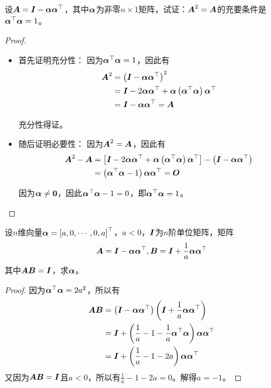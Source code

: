 \begin{problem}\label{problem-1.19}
设\(\mata=\mati-\vecal\vecal^\top\)，其中\(\vecal\)为非零\(n\times1\)矩阵，试证：\(\mata^2=\mata\)的充要条件是\(\vecal^\top\vecal=1\)。
\end{problem}
\begin{proof}
    \begin{itemize}
        \item 首先证明充分性：
              因为\(\vecal^\top\vecal=1\)，因此有
              \begin{align*}
                  \mata^2 & =\mypar{\mati-\vecal\vecal^\top}^2                                   \\
                          & =\mati-2\vecal\vecal^\top+\vecal\mypar{\vecal^\top\vecal}\vecal^\top \\
                          & =\mati-\vecal\vecal^\top=\mata
              \end{align*}

              充分性得证。

        \item 随后证明必要性：
              因为\(\mata^2=\mata\)，因此有
              \begin{align*}
                  \mata^2-\mata & =\mat{\mati-2\vecal\vecal^\top+\vecal\mypar{\vecal^\top\vecal}\vecal^\top}-\mypar{\mati-\vecal\vecal^\top} \\
                                & =\mypar{\vecal^\top\vecal-1}\vecal\vecal^\top=\mato
              \end{align*}

              因为\(\vecal\neq\veczero\)，因此\(\vecal^\top\vecal-1=0\)，即\(\vecal^\top\vecal=1\)。
    \end{itemize}
\end{proof}

\begin{problem}\label{problem-1.20}
设\(n\)维向量\(\vecal=\myvec{a,0,\cdots,0,a}\)，\(a<0\)，\(\mati\)为\(n\)阶单位矩阵，矩阵
\begin{equation*}
    \mata=\mati-\vecal\vecal^\top,\matb=\mati+\frac{1}{a}\vecal\vecal^\top
\end{equation*}
其中\(\mata\matb=\mati\)，求\(\vecal\)。
\end{problem}
\begin{proof}
    因为\(\vecal^\top\vecal=2a^2\)，所以有
    \begin{align*}
        \mata\matb & =\mypar{\mati-\vecal\vecal^\top}\mypar{\mati+\frac{1}{a}\vecal\vecal^\top} \\
                   & =\mati+\mypar{\frac{1}{a}-1-\frac{1}{a}\vecal^\top\vecal}\vecal\vecal^\top \\
                   & =\mati+\mypar{\frac{1}{a}-1-2a}\vecal\vecal^\top
    \end{align*}
    又因为\(\mata\matb=\mati\)且\(a<0\)，所以有\(\frac{1}{a}-1-2a=0\)。解得\(a=-1\)。
\end{proof}

